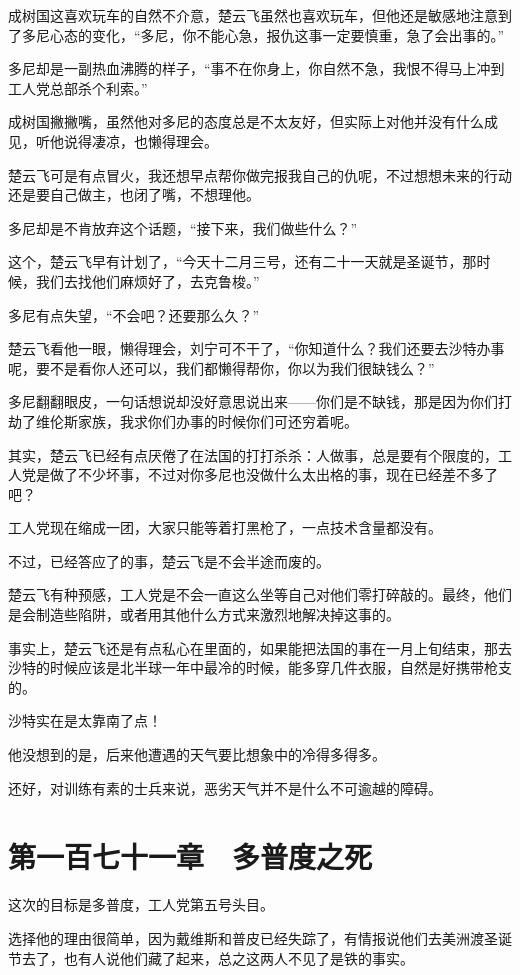 成树国这喜欢玩车的自然不介意，楚云飞虽然也喜欢玩车，但他还是敏感地注意到了多尼心态的变化，“多尼，你不能心急，报仇这事一定要慎重，急了会出事的。”

多尼却是一副热血沸腾的样子，“事不在你身上，你自然不急，我恨不得马上冲到工人党总部杀个利索。”

成树国撇撇嘴，虽然他对多尼的态度总是不太友好，但实际上对他并没有什么成见，听他说得凄凉，也懒得理会。

楚云飞可是有点冒火，我还想早点帮你做完报我自己的仇呢，不过想想未来的行动还是要自己做主，也闭了嘴，不想理他。

多尼却是不肯放弃这个话题，“接下来，我们做些什么？”

这个，楚云飞早有计划了，“今天十二月三号，还有二十一天就是圣诞节，那时候，我们去找他们麻烦好了，去克鲁梭。”

多尼有点失望，“不会吧？还要那么久？”

楚云飞看他一眼，懒得理会，刘宁可不干了，“你知道什么？我们还要去沙特办事呢，要不是看你人还可以，我们都懒得帮你，你以为我们很缺钱么？”

多尼翻翻眼皮，一句话想说却没好意思说出来——你们是不缺钱，那是因为你们打劫了维伦斯家族，我求你们办事的时候你们可还穷着呢。

其实，楚云飞已经有点厌倦了在法国的打打杀杀：人做事，总是要有个限度的，工人党是做了不少坏事，不过对你多尼也没做什么太出格的事，现在已经差不多了吧？

工人党现在缩成一团，大家只能等着打黑枪了，一点技术含量都没有。

不过，已经答应了的事，楚云飞是不会半途而废的。

楚云飞有种预感，工人党是不会一直这么坐等自己对他们零打碎敲的。最终，他们是会制造些陷阱，或者用其他什么方式来激烈地解决掉这事的。

事实上，楚云飞还是有点私心在里面的，如果能把法国的事在一月上旬结束，那去沙特的时候应该是北半球一年中最冷的时候，能多穿几件衣服，自然是好携带枪支的。

沙特实在是太靠南了点！

他没想到的是，后来他遭遇的天气要比想象中的冷得多得多。

还好，对训练有素的士兵来说，恶劣天气并不是什么不可逾越的障碍。

\section{第一百七十一章　多普度之死}

这次的目标是多普度，工人党第五号头目。

选择他的理由很简单，因为戴维斯和普皮已经失踪了，有情报说他们去美洲渡圣诞节去了，也有人说他们藏了起来，总之这两人不见了是铁的事实。

